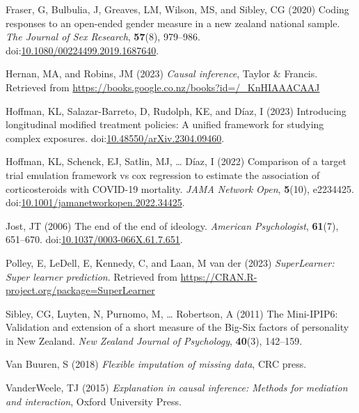 \documentclass[
  singlecolumn]{article}
\newlength{\cslhangindent}
\newenvironment{CSLReferences}[2] %
 {\begin{list}{}{%
  \setlength{\itemindent}{0pt}
  \setlength{\leftmargin}{0pt}
  \setlength{\parsep}{0pt}
  \ifodd #1
   \setlength{\leftmargin}{\cslhangindent}
   \setlength{\itemindent}{-1\cslhangindent}
  \fi
  \setlength{\itemsep}{#2\baselineskip}}}
 {\end{list}}
\begin{document}
\begin{CSLReferences}{1}{0}
Fraser, G, Bulbulia, J, Greaves, LM, Wilson, MS, and Sibley, CG (2020)
Coding responses to an open-ended gender measure in a new zealand
national sample. \emph{The Journal of Sex Research}, \textbf{57}(8),
979--986.
doi:\href{https://doi.org/10.1080/00224499.2019.1687640}{10.1080/00224499.2019.1687640}.

Hernan, MA, and Robins, JM (2023) \emph{Causal inference}, Taylor \&
Francis. Retrieved from
\url{https://books.google.co.nz/books?id=/_KnHIAAACAAJ}

Hoffman, KL, Salazar-Barreto, D, Rudolph, KE, and Díaz, I (2023)
Introducing longitudinal modified treatment policies: A unified
framework for studying complex exposures.
doi:\href{https://doi.org/10.48550/arXiv.2304.09460}{10.48550/arXiv.2304.09460}.

Hoffman, KL, Schenck, EJ, Satlin, MJ, \ldots{} Díaz, I (2022) Comparison
of a target trial emulation framework vs cox regression to estimate the
association of corticosteroids with COVID-19 mortality. \emph{JAMA
Network Open}, \textbf{5}(10), e2234425.
doi:\href{https://doi.org/10.1001/jamanetworkopen.2022.34425}{10.1001/jamanetworkopen.2022.34425}.

Jost, JT (2006) The end of the end of ideology. \emph{American
Psychologist}, \textbf{61}(7), 651--670.
doi:\href{https://doi.org/10.1037/0003-066X.61.7.651}{10.1037/0003-066X.61.7.651}.

Polley, E, LeDell, E, Kennedy, C, and Laan, M van der (2023)
\emph{SuperLearner: Super learner prediction}. Retrieved from
\url{https://CRAN.R-project.org/package=SuperLearner}

Sibley, CG, Luyten, N, Purnomo, M, \ldots{} Robertson, A (2011) The
Mini-IPIP6: Validation and extension of a short measure of the Big-Six
factors of personality in New Zealand. \emph{New Zealand Journal of
Psychology}, \textbf{40}(3), 142--159.

Van Buuren, S (2018) \emph{Flexible imputation of missing data}, CRC
press.

VanderWeele, TJ (2015) \emph{Explanation in causal inference: Methods
for mediation and interaction}, Oxford University Press.


\end{CSLReferences}
\end{document}
